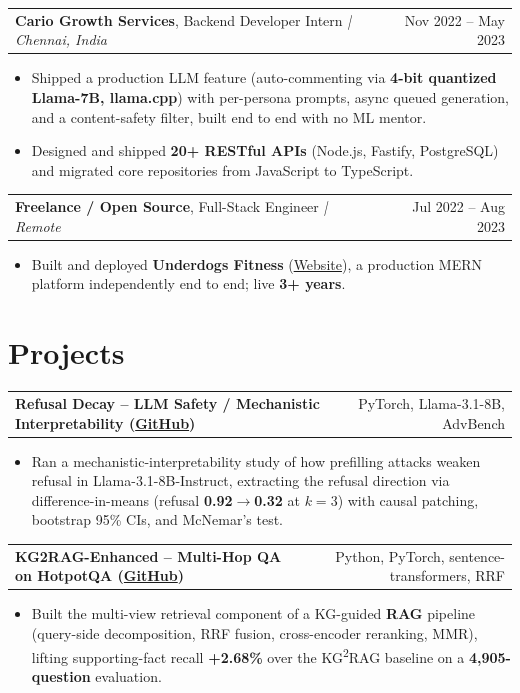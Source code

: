 \documentclass[letterpaper,11pt]{article}
\makeatletter
\newcommand{\expItem}[4]{%
  \vspace{3pt}
  \begin{tabular*}{\textwidth}{@{}l@{\extracolsep{\fill}}r@{}}
    \textbf{#1}, #2 \textit{| #3} & #4 \\
  \end{tabular*}\par\vspace{-2pt}
}
\newcommand{\projItem}[2]{%
  \vspace{6pt}
  \begin{tabular*}{\textwidth}{@{}l@{\extracolsep{\fill}}r@{}}
    \textbf{#1} & #2 \\
  \end{tabular*}\par\vspace{-2pt}
}
\makeatother
\begin{document}
\expItem{Cario Growth Services}{Backend Developer Intern}{Chennai, India}{Nov 2022 -- May 2023}
\begin{itemize}
  \item Shipped a production LLM feature (auto-commenting via \textbf{4-bit quantized Llama-7B, llama.cpp}) with per-persona prompts, async queued generation, and a content-safety filter, built end to end with no ML mentor.
  \item Designed and shipped \textbf{20+ RESTful APIs} (Node.js, Fastify, PostgreSQL) and migrated core repositories from JavaScript to TypeScript.
\end{itemize}

\expItem{Freelance / Open Source}{Full-Stack Engineer}{Remote}{Jul 2022 -- Aug 2023}
\begin{itemize}
  \item Built and deployed \textbf{Underdogs Fitness} (\href{https://www.underdogsfitness.in/}{Website}), a production MERN platform independently end to end; live \textbf{3+ years}.
\end{itemize}

\section{Projects}

\projItem{Refusal Decay -- LLM Safety / Mechanistic Interpretability {\normalfont\small(\href{https://github.com/Deva-1903/refusal-decay}{GitHub})}}{PyTorch, Llama-3.1-8B, AdvBench}
\begin{itemize}
  \item Ran a mechanistic-interpretability study of how prefilling attacks weaken refusal in Llama-3.1-8B-Instruct, extracting the refusal direction via difference-in-means (refusal \textbf{0.92$\to$0.32} at $k{=}3$) with causal patching, bootstrap 95\% CIs, and McNemar's test.
\end{itemize}

\projItem{KG2RAG-Enhanced -- Multi-Hop QA on HotpotQA {\normalfont\small(\href{https://github.com/Deva-1903/KG2RAG-685-NLP}{GitHub})}}{Python, PyTorch, sentence-transformers, RRF}
\begin{itemize}
  \item Built the multi-view retrieval component of a KG-guided \textbf{RAG} pipeline (query-side decomposition, RRF fusion, cross-encoder reranking, MMR), lifting supporting-fact recall \textbf{+2.68\%} over the KG\textsuperscript{2}RAG baseline on a \textbf{4{,}905-question} evaluation.
\end{itemize}
\end{document}
